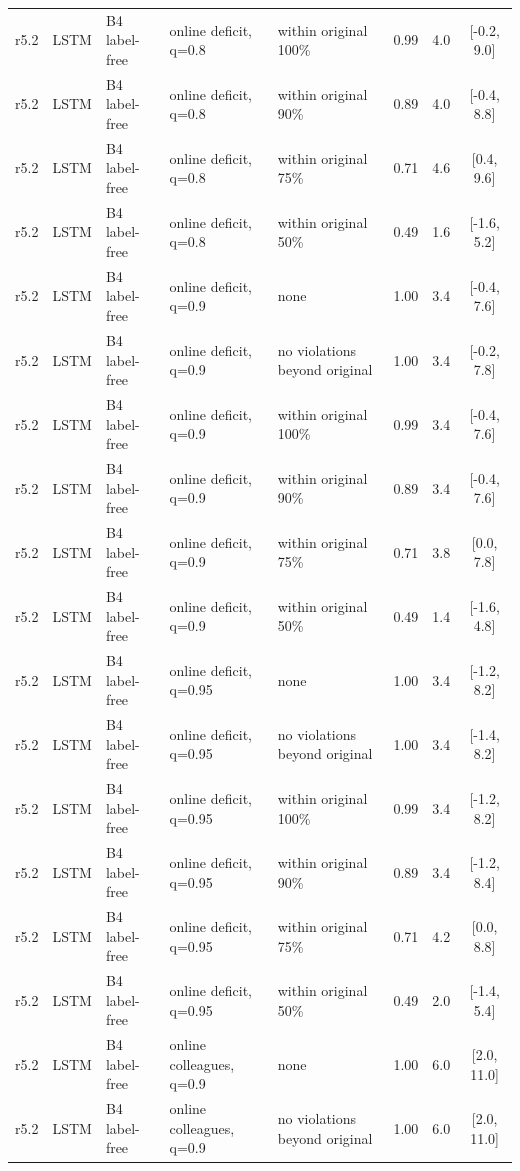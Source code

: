 \begin{longtable}{lllp{4.2cm}p{3.4cm}ccc}
r5.2 & LSTM & B4 label-free & online deficit, q=0.8 & within original 100\% & 0.99 & 4.0 & [-0.2, 9.0] \\
r5.2 & LSTM & B4 label-free & online deficit, q=0.8 & within original 90\% & 0.89 & 4.0 & [-0.4, 8.8] \\
r5.2 & LSTM & B4 label-free & online deficit, q=0.8 & within original 75\% & 0.71 & 4.6 & [0.4, 9.6] \\
r5.2 & LSTM & B4 label-free & online deficit, q=0.8 & within original 50\% & 0.49 & 1.6 & [-1.6, 5.2] \\
r5.2 & LSTM & B4 label-free & online deficit, q=0.9 & none & 1.00 & 3.4 & [-0.4, 7.6] \\
r5.2 & LSTM & B4 label-free & online deficit, q=0.9 & no violations beyond original & 1.00 & 3.4 & [-0.2, 7.8] \\
r5.2 & LSTM & B4 label-free & online deficit, q=0.9 & within original 100\% & 0.99 & 3.4 & [-0.4, 7.6] \\
r5.2 & LSTM & B4 label-free & online deficit, q=0.9 & within original 90\% & 0.89 & 3.4 & [-0.4, 7.6] \\
r5.2 & LSTM & B4 label-free & online deficit, q=0.9 & within original 75\% & 0.71 & 3.8 & [0.0, 7.8] \\
r5.2 & LSTM & B4 label-free & online deficit, q=0.9 & within original 50\% & 0.49 & 1.4 & [-1.6, 4.8] \\
r5.2 & LSTM & B4 label-free & online deficit, q=0.95 & none & 1.00 & 3.4 & [-1.2, 8.2] \\
r5.2 & LSTM & B4 label-free & online deficit, q=0.95 & no violations beyond original & 1.00 & 3.4 & [-1.4, 8.2] \\
r5.2 & LSTM & B4 label-free & online deficit, q=0.95 & within original 100\% & 0.99 & 3.4 & [-1.2, 8.2] \\
r5.2 & LSTM & B4 label-free & online deficit, q=0.95 & within original 90\% & 0.89 & 3.4 & [-1.2, 8.4] \\
r5.2 & LSTM & B4 label-free & online deficit, q=0.95 & within original 75\% & 0.71 & 4.2 & [0.0, 8.8] \\
r5.2 & LSTM & B4 label-free & online deficit, q=0.95 & within original 50\% & 0.49 & 2.0 & [-1.4, 5.4] \\
r5.2 & LSTM & B4 label-free & online colleagues, q=0.9 & none & 1.00 & 6.0 & [2.0, 11.0] \\
r5.2 & LSTM & B4 label-free & online colleagues, q=0.9 & no violations beyond original & 1.00 & 6.0 & [2.0, 11.0] \\

\end{longtable}
